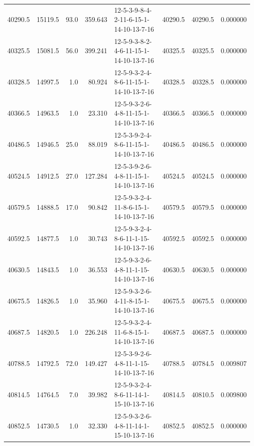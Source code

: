 \begin{tabular}{rrrrlrrr}
 40290.5 &  15119.5 &           93.0 &            359.643 &  12-5-3-9-8-4-2-11-6-15-1-14-10-13-7-16 &       40290.5 &         40290.5 &  0.000000 \\
 40325.5 &  15081.5 &           56.0 &            399.241 &  12-5-9-3-8-2-4-6-11-15-1-14-10-13-7-16 &       40325.5 &         40325.5 &  0.000000 \\
 40328.5 &  14997.5 &            1.0 &             80.924 &  12-5-9-3-2-4-8-6-11-15-1-14-10-13-7-16 &       40328.5 &         40328.5 &  0.000000 \\
 40366.5 &  14963.5 &            1.0 &             23.310 &  12-5-9-3-2-6-4-8-11-15-1-14-10-13-7-16 &       40366.5 &         40366.5 &  0.000000 \\
 40486.5 &  14946.5 &           25.0 &             88.019 &  12-5-3-9-2-4-8-6-11-15-1-14-10-13-7-16 &       40486.5 &         40486.5 &  0.000000 \\
 40524.5 &  14912.5 &           27.0 &            127.284 &  12-5-3-9-2-6-4-8-11-15-1-14-10-13-7-16 &       40524.5 &         40524.5 &  0.000000 \\
 40579.5 &  14888.5 &           17.0 &             90.842 &  12-5-9-3-2-4-11-8-6-15-1-14-10-13-7-16 &       40579.5 &         40579.5 &  0.000000 \\
 40592.5 &  14877.5 &            1.0 &             30.743 &  12-5-9-3-2-4-8-6-11-1-15-14-10-13-7-16 &       40592.5 &         40592.5 &  0.000000 \\
 40630.5 &  14843.5 &            1.0 &             36.553 &  12-5-9-3-2-6-4-8-11-1-15-14-10-13-7-16 &       40630.5 &         40630.5 &  0.000000 \\
 40675.5 &  14826.5 &            1.0 &             35.960 &  12-5-9-3-2-6-4-11-8-15-1-14-10-13-7-16 &       40675.5 &         40675.5 &  0.000000 \\
 40687.5 &  14820.5 &            1.0 &            226.248 &  12-5-9-3-2-4-11-6-8-15-1-14-10-13-7-16 &       40687.5 &         40687.5 &  0.000000 \\
 40788.5 &  14792.5 &           72.0 &            149.427 &  12-5-3-9-2-6-4-8-11-1-15-14-10-13-7-16 &       40788.5 &         40784.5 &  0.009807 \\
 40814.5 &  14764.5 &            7.0 &             39.982 &  12-5-9-3-2-4-8-6-11-14-1-15-10-13-7-16 &       40814.5 &         40810.5 &  0.009800 \\
 40852.5 &  14730.5 &            1.0 &             32.330 &  12-5-9-3-2-6-4-8-11-14-1-15-10-13-7-16 &       40852.5 &         40852.5 &  0.000000 \\

\end{tabular}
